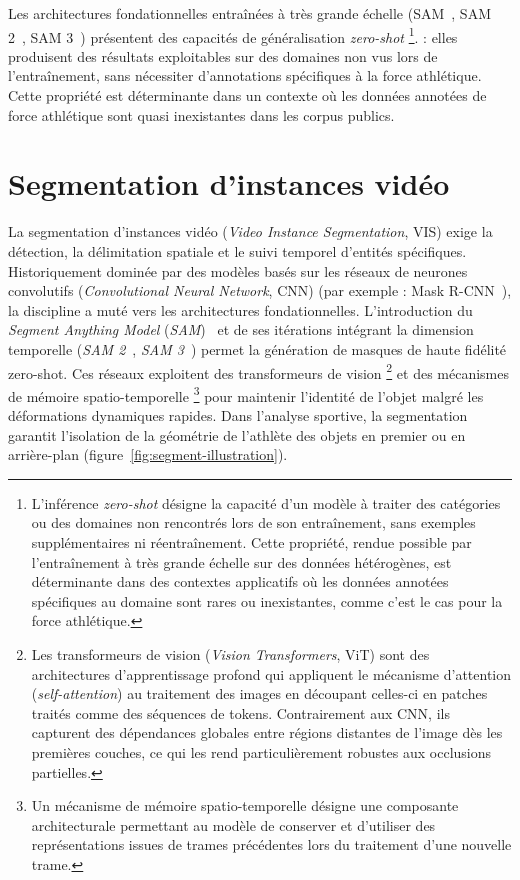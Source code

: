 Les architectures fondationnelles entraînées à très grande échelle (SAM~\cite{SAM-2023}, SAM 2~\cite{SAM2-2024}, SAM 3~\cite{SAM3-2025}) présentent des capacités de généralisation \textit{zero-shot} \footnote{L'inférence \textit{zero-shot} désigne la capacité d'un modèle à traiter des catégories ou des domaines non rencontrés lors de son entraînement, sans exemples supplémentaires ni réentraînement. Cette propriété, rendue possible par l'entraînement à très grande échelle sur des données hétérogènes, est déterminante dans des contextes applicatifs où les données annotées spécifiques au domaine sont rares ou inexistantes, comme c'est le cas pour la force athlétique.}. : elles produisent des résultats exploitables sur des domaines non vus lors de l'entraînement, sans nécessiter d'annotations spécifiques à la force athlétique. Cette propriété est déterminante dans un contexte où les données annotées de force athlétique sont quasi inexistantes dans les corpus publics.

\section{Segmentation d'instances vidéo} 

La segmentation d'instances vidéo (\textit{Video Instance Segmentation}, VIS) exige la détection, la délimitation spatiale et le suivi temporel d'entités spécifiques. Historiquement dominée par des modèles basés sur les réseaux de neurones convolutifs (\textit{Convolutional Neural Network}, CNN) (par exemple : Mask R-CNN~\cite{Mask-R-CNN-2018}), la discipline a muté vers les architectures fondationnelles. L'introduction du \textit{Segment Anything Model} (\textit{SAM})~\cite{SAM-2023} et de ses itérations intégrant la dimension temporelle (\textit{SAM 2}~\cite{SAM2-2024}, \textit{SAM 3}~\cite{SAM3-2025}) permet la génération de masques de haute fidélité zero-shot. Ces réseaux exploitent des transformeurs de vision \footnote{Les transformeurs de vision (\emph{Vision Transformers}, ViT) sont des architectures d'apprentissage profond qui appliquent le mécanisme d'attention (\emph{self-attention}) au traitement des images en découpant celles-ci en patches traités comme des séquences de tokens. Contrairement aux CNN, ils capturent des dépendances globales entre régions distantes de l'image dès les premières couches, ce qui les rend particulièrement robustes aux occlusions partielles.} et des mécanismes de mémoire spatio-temporelle \footnote{Un mécanisme de mémoire spatio-temporelle désigne une composante architecturale permettant au modèle de conserver et d'utiliser des représentations issues de trames précédentes lors du traitement d'une nouvelle trame.} pour maintenir l'identité de l'objet malgré les déformations dynamiques rapides. Dans l'analyse sportive, la segmentation garantit l'isolation de la géométrie de l'athlète des objets en premier ou en arrière-plan (figure~\ref{fig:segment-illustration}).

